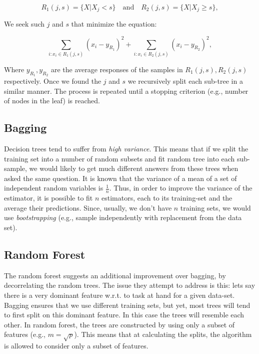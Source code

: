 \documentclass[twoside]{article}
\begin{document}
\begin{equation}
  R_1(j,s) = \{ X\lvert X_j<s \}\quad\text{and}\quad R_2(j,s) = \{ X\lvert X_j \geq s \},
\end{equation}

We seek such $j$ and $s$ that minimize the equation:

\begin{equation}
  \sum\limits_{i:x_i\in R_1(j,s)}{(x_i-y_{R_1})}^2 + \sum\limits_{i:x_i\in R_2(j,s)}{(x_i-y_{R_2})}^2,
\end{equation}

Where $y_{R_1}, y_{R_2}$ are the average responses of the samples in
$R_1(j,s), R_2(j,s)$ respectively.  Once we found the $j$ and $s$ we
recursively split each sub-tree in a similar manner.  The process is
repeated until a stopping criterion (e.g., number of nodes in the
leaf) is reached.

\subsection{Bagging}
Decision trees tend to suffer from \textit{high variance}. This means
that if we split the training set into a number of random subsets and
fit random tree into each sub-sample, we would likely to get much
different answers from these trees when asked the same question.  It
is known that the variance of a mean of a set of independent random
variables is $\frac{1}{n}$.  Thus, in order to improve the variance of
the estimator, it is possible to fit $n$ estimators, each to its
training-set and the average their predictions.  Since, usually, we
don't have $n$ training sets, we would use \textit{bootstrapping}
(e.g., sample independently with replacement from the data set).

\subsection{Random Forest}
The random forest suggests an additional improvement over bagging, by
decorrelating the random trees.  The issue they attempt to address is
this: lets say there is a very dominant feature w.r.t. to task at hand
for a given data-set.  Bagging ensures that we use different training
sets, but yet, most trees will tend to first split on this dominant
feature.  In this case the trees will resemble each other.  In random
forest, the trees are constructed by using only a subset of features
(e.g., $m = \sqrt{p}$).  This means that at calculating the splits,
the algorithm is allowed to consider only a subset of features.
\end{document}
